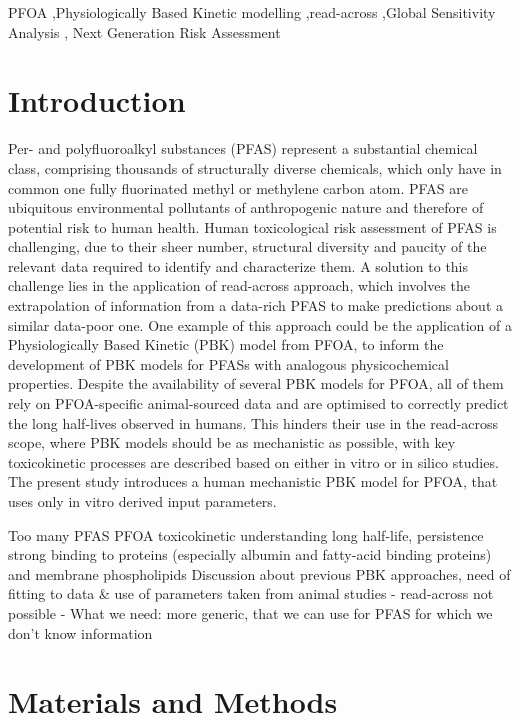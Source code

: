 \documentclass[
  authoryear,
  preprint]{elsarticle}
\begin{document}
\begin{frontmatter}
\begin{keyword}
    PFOA \sep Physiologically Based Kinetic
modelling \sep read-across \sep Global Sensitivity Analysis \sep 
    Next Generation Risk Assessment
\end{keyword}
\end{frontmatter}
    

\section{Introduction}\label{introduction}

Per- and polyfluoroalkyl substances (PFAS) represent a substantial
chemical class, comprising thousands of structurally diverse chemicals,
which only have in common one fully fluorinated methyl or methylene
carbon atom. PFAS are ubiquitous environmental pollutants of
anthropogenic nature and therefore of potential risk to human health.
Human toxicological risk assessment of PFAS is challenging, due to their
sheer number, structural diversity and paucity of the relevant data
required to identify and characterize them. A solution to this challenge
lies in the application of read-across approach, which involves the
extrapolation of information from a data-rich PFAS to make predictions
about a similar data-poor one. One example of this approach could be the
application of a Physiologically Based Kinetic (PBK) model from PFOA, to
inform the development of PBK models for PFASs with analogous
physicochemical properties. Despite the availability of several PBK
models for PFOA, all of them rely on PFOA-specific animal-sourced data
and are optimised to correctly predict the long half-lives observed in
humans. This hinders their use in the read-across scope, where PBK
models should be as mechanistic as possible, with key toxicokinetic
processes are described based on either in vitro or in silico studies.
The present study introduces a human mechanistic PBK model for PFOA,
that uses only in vitro derived input parameters.

Too many PFAS PFOA toxicokinetic understanding long half-life,
persistence strong binding to proteins (especially albumin and
fatty-acid binding proteins) and membrane phospholipids Discussion about
previous PBK approaches, need of fitting to data \& use of parameters
taken from animal studies - read-across not possible - What we need:
more generic, that we can use for PFAS for which we don't know
information

\section{Materials and Methods}\label{materials-and-methods}
\end{document}
